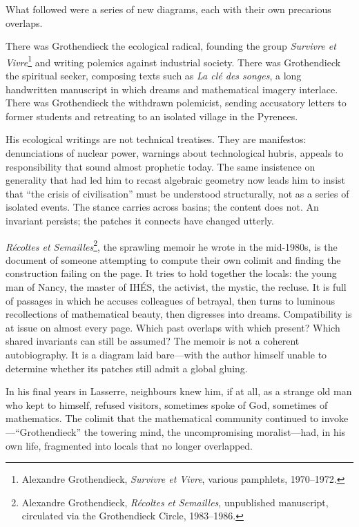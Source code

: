 What followed were a series of new diagrams, each with their own precarious overlaps.

There was Grothendieck the ecological radical, founding the group \emph{Survivre et Vivre}\footnote{Alexandre Grothendieck, \emph{Survivre et Vivre}, various pamphlets, 1970--1972.} and writing polemics against industrial society. There was Grothendieck the spiritual seeker, composing texts such as \emph{La cl\'{e} des songes}, a long handwritten manuscript in which dreams and mathematical imagery interlace. There was Grothendieck the withdrawn polemicist, sending accusatory letters to former students and retreating to an isolated village in the Pyrenees.

His ecological writings are not technical treatises. They are manifestos: denunciations of nuclear power, warnings about technological hubris, appeals to responsibility that sound almost prophetic today. The same insistence on generality that had led him to recast algebraic geometry now leads him to insist that ``the crisis of civilisation'' must be understood structurally, not as a series of isolated events. The stance carries across basins; the content does not. An invariant persists; the patches it connects have changed utterly.

\emph{R\'{e}coltes et Semailles}\footnote{Alexandre Grothendieck, \emph{R\'{e}coltes et Semailles}, unpublished manuscript, circulated via the Grothendieck Circle, 1983--1986.}, the sprawling memoir he wrote in the mid-1980s, is the document of someone attempting to compute their own colimit and finding the construction failing on the page. It tries to hold together the locals: the young man of Nancy, the master of IH\'{E}S, the activist, the mystic, the recluse. It is full of passages in which he accuses colleagues of betrayal, then turns to luminous recollections of mathematical beauty, then digresses into dreams. Compatibility is at issue on almost every page. Which past overlaps with which present? Which shared invariants can still be assumed? The memoir is not a coherent autobiography. It is a diagram laid bare---with the author himself unable to determine whether its patches still admit a global gluing.

In his final years in Lasserre, neighbours knew him, if at all, as a strange old man who kept to himself, refused visitors, sometimes spoke of God, sometimes of mathematics. The colimit that the mathematical community continued to invoke---``Grothendieck'' the towering mind, the uncompromising moralist---had, in his own life, fragmented into locals that no longer overlapped.

